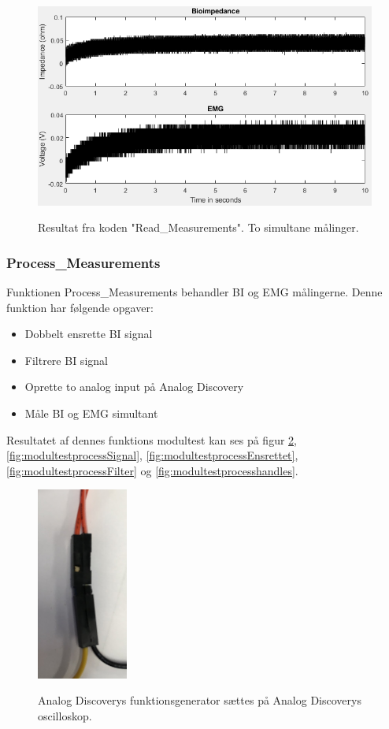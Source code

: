 \begin{figure}[H] 
\centering
{\includegraphics[width=\linewidth]
{Figure/modultestread}}
\caption{Resultat fra koden "Read\_Measurements". To simultane målinger.}
\label{fig:modultestread}
\end{figure}




\subsubsection{Process\_Measurements} 

Funktionen Process\_Measurements behandler BI og EMG målingerne. Denne funktion har følgende opgaver:
\begin{itemize}
\item Dobbelt ensrette BI signal
\item Filtrere BI signal 
\item Oprette to analog input på Analog Discovery
\item Måle BI og EMG simultant
\end{itemize}

Resultatet af dennes funktions modultest kan ses på figur \ref{fig:modultestsinus2}, \ref{fig:modultestprocessSignal}, \ref{fig:modultestprocessEnsrettet}, \ref{fig:modultestprocessFilter} og \ref{fig:modultestprocesshandles}.


\begin{figure}[H] 
\centering
{\includegraphics[width=3cm]
{Figure/modultestsinus2}}
\caption{Analog Discoverys funktionsgenerator sættes på Analog Discoverys oscilloskop.}
\label{fig:modultestsinus2}
\end{figure}

